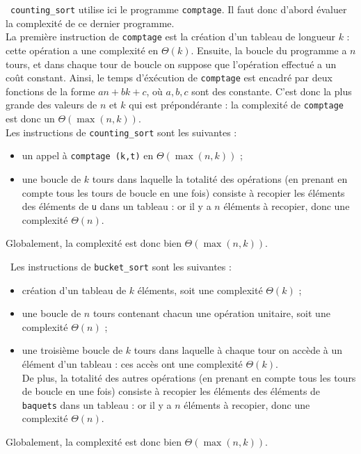 \question\ \verb|counting_sort| utilise ici le programme \verb|comptage|. Il faut 
donc d'abord évaluer la complexité de ce dernier programme.\\
La première instruction de \verb|comptage| est la création d'un tableau de 
longueur $k$ : cette opération a une complexité en $\Theta(k)$. Ensuite, la 
boucle du programme a $n$ tours, et dans chaque tour de boucle on suppose que 
l'opération effectué a un coût constant. Ainsi, le temps d'éxécution de 
\verb|comptage| est encadré par deux fonctions de la forme $an+bk+c$, où 
$a,b,c$ sont des constante. C'est donc la plus grande des valeurs de $n$ et $k$ 
qui est prépondérante : la complexité de \verb|comptage| est donc un 
$\Theta(\max(n,k))$.\\
Les instructions de \verb|counting_sort| sont les suivantes :
\begin{itemize}
\item un appel à  \verb|comptage (k,t)| en $\Theta(\max(n,k))$ ;
\item une boucle de $k$ tours dans laquelle la totalité des
opérations (en prenant en compte tous les tours de boucle en une fois) consiste 
à recopier les éléments des éléments de \verb|u| dans un tableau : or il y 
a $n$ éléments à recopier, donc une complexité $\Theta(n)$.
\end{itemize}
Globalement, la complexité est donc bien $\Theta(\max(n,k))$.

\question\ Les instructions de \verb|bucket_sort| sont les suivantes :
\begin{itemize}
\item création d'un tableau de $k$ éléments, soit une complexité $\Theta(k)$ ;
\item une boucle de $n$ tours contenant chacun une opération unitaire, soit 
une complexité $\Theta(n)$ ;
\item une troisième boucle de $k$ tours dans laquelle à chaque tour on accède à 
un élément d'un tableau : ces accès ont une complexité $\Theta(k)$.\\
De plus,  la totalité des autres
opérations (en prenant en compte tous les tours de boucle en une fois) consiste 
à recopier les éléments des éléments de \verb|baquets| dans un tableau : or il y 
a $n$ éléments à recopier, donc une complexité $\Theta(n)$.
\end{itemize}
Globalement, la complexité est donc bien $\Theta(\max(n,k))$.\\

